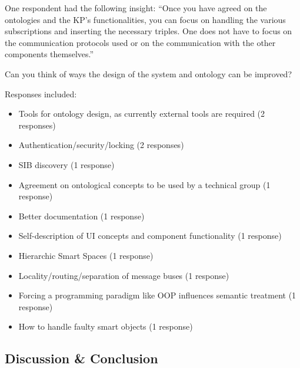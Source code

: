 One respondent had the following insight: ``Once you have agreed on the ontologies and the KP's functionalities, you can focus on handling the various subscriptions and inserting the necessary triples. One does not have to focus on the communication protocols used or on the communication with the other components themselves.''\\


\begin{cdquestion}
	Can you think of ways the design of the system and ontology can be improved?
\end{cdquestion}

Responses included:

\begin{itemize}
	\item Tools for ontology design, as currently external tools are required (2 responses)
	\item Authentication/security/locking (2 responses)
	\item \ac{SIB} discovery (1 response)
	\item Agreement on ontological concepts to be used by a technical group (1 response)
	
	\item Better documentation (1 response)
	\item Self-description of UI concepts and component functionality (1 response)
	\item Hierarchic Smart Spaces (1 response)
	\item Locality/routing/separation of message buses (1 response)
	
	\item Forcing a programming paradigm like \ac{OOP} influences semantic treatment (1 response)
	\item How to handle faulty smart objects (1 response)
\end{itemize}


\subsection{Discussion \& Conclusion}


